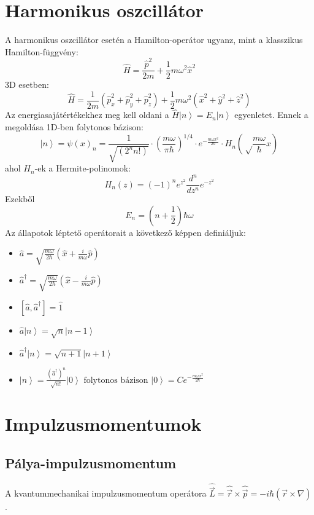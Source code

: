 \documentclass[12pt]{article}
\theoremstyle{plain}
\newcommand{\ket}[1]{\left| #1 \right >}
\newcommand{\commut}[2]{\left [ #1 , #2 \right]}
\begin{document}
\section{Harmonikus oszcillátor}
A harmonikus oszcillátor esetén a Hamilton-operátor ugyanz, mint a klasszikus Hamilton-függvény:
\[
  \hat H = \frac{\hat p^2}{2m} + \frac{1}{2}m\omega^2 \hat x^2  
\]
3D esetben:
\[
    \hat H = \frac{1}{2m}(\hat p_x^2+\hat p_y^2+\hat p_z^2) + \frac{1}{2}m\omega^2 (\hat x^2 + \hat y^2 + \hat z^2)  
\]
Az energiasajátértékekhez meg kell oldani a $\hat H \ket n = E_n \ket n$ egyenletet. Ennek a megoldása 1D-ben
folytonos bázison:
\[
    \ket n = \psi(x)_n = \frac{1}{\sqrt{(2^n n!)}} \cdot \left (\frac{m\omega}{\pi\hbar}\right)^{1/4}
    \cdot e^{-\frac{m\omega x^2}{2\hbar}} \cdot H_n\left(\sqrt\frac{m\omega}{\hbar}x\right)    
\]
ahol $H_n$-ek a Hermite-polinomok:
\[
    H_n(z) = (-1)^n e^z^2 \frac{d^n}{dz^n}e^{-z^2}
\]
Ezekből 
\[
    E_n = \left(n + \frac{1}{2}\right)   \hbar \omega 
\]
Az állapotok léptető operátorait a következő képpen definiáljuk:
\begin{itemize}
    \item $
        \hat a = \sqrt{\frac{m\omega}{2\hbar}}\left(\hat x + \frac{i}{m\omega}\hat p\right)
    $
    \item $
       \hat a^{\dag} = \sqrt{\frac{m\omega}{2\hbar}}\left(\hat x - \frac{i}{m\omega}\hat p\right)
    $
    \item $
        \commut{\hat a}{\hat a^{\dag}} = \hat 1
    $
    \item $
        \hat a \ket n = \sqrt n \ket{n-1}
    $
    \item $
        \hat a^{\dag} \ket n = \sqrt{n+1}\ket{n+1}
    $
    \item $
        \ket n = \frac{(\hat a^{\dag})^n}{\sqrt{n!}}\ket 0 
        \textrm{  folytonos bázison  } \ket 0 = Ce^{-\frac{m\omega x^2}{2\hbar}}
    $
\end{itemize}
\section{Impulzusmomentumok}
\subsection{Pálya-impulzusmomentum}
A kvantummechanikai impulzusmomentum operátora $\hat{\vec L} = \hat{\vec r} \times \hat{\vec p} = -i \hbar (\vec r \times \nabla)$.
\end{document}
